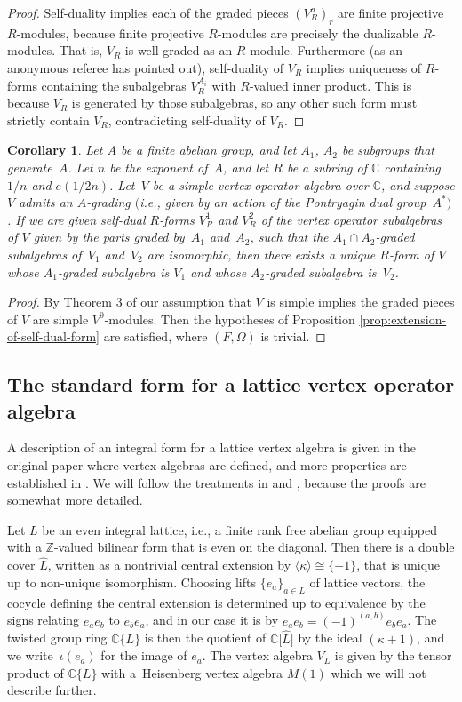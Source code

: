 \documentclass[pdftex]{sigma}
\newcommand{\bC}{\mathbb{C}}
\newcommand{\bZ}{\mathbb{Z}}
\newtheorem{cor}[thm]{Corollary}
\theoremstyle{definition}
\begin{document}
\begin{proof}
Self-duality implies each of the graded pieces $(V^a_R)_r$ are finite projective $R$-modules, because finite projective $R$-modules are precisely the dualizable $R$-modules. That is, $V_R$ is well-graded as an $R$-module. Furthermore (as an anonymous referee has pointed out), self-duality of $V_R$ implies uniqueness of $R$-forms containing the subalgebras $V^{A_i}_R$ with $R$-valued inner product. This is because $V_R$ is generated by those subalgebras, so any other such form must strictly contain $V_R$, contradicting self-duality of $V_R$.
\end{proof}

\begin{cor} \label{cor:voa-generated-by-subvoas}Let $A$ be a finite abelian group, and let $A_1$, $A_2$ be subgroups that generate~$A$. Let $n$ be the exponent of~$A$, and let $R$ be a subring of $\bC$ containing $1/n$ and $e(1/2n)$. Let~$V$ be a simple vertex operator algebra over $\bC$, and suppose $V$ admits an $A$-grading $($i.e., given by an action of the Pontryagin dual group~$A^*)$. If we are given self-dual $R$-forms $V_R^1$ and $V_R^2$ of the vertex operator subalgebras of $V$ given by the parts graded by~$A_1$ and~$A_2$, such that the $A_1 \cap A_2$-graded subalgebras of~$V_1$ and~$V_2$ are isomorphic, then there exists a unique $R$-form of $V$ whose $A_1$-graded subalgebra is $V_1$ and whose $A_2$-graded subalgebra is~$V_2$.
\end{cor}
\begin{proof}
By Theorem 3 of \cite{DM94a} our assumption that $V$ is simple implies the graded pieces of $V$ are simple $V^0$-modules. Then the hypotheses of Proposition \ref{prop:extension-of-self-dual-form} are satisfied, where $(F,\Omega)$ is trivial.
\end{proof}

\subsection{The standard form for a lattice vertex operator algebra}

A description of an integral form for a lattice vertex algebra is given in the original paper \cite{B86} where vertex algebras are defined, and more properties are established in \cite{B99}. We will follow the treatments in \cite{DG12} and \cite{M14}, because the proofs are somewhat more detailed.

Let $L$ be an even integral lattice, i.e., a finite rank free abelian group equipped with a $\bZ$-valued bilinear form that is even on the diagonal. Then there is a double cover $\hat{L}$, written as a nontrivial central extension by $ \langle \kappa \rangle \cong \{\pm 1\}$, that is unique up to non-unique isomorphism. Choosing lifts $\{ e_a \}_{a\in L}$ of lattice vectors, the cocycle defining the central extension is determined up to equivalence by the signs relating $e_a e_b$ to $e_b e_a$, and in our case it is by $e_a e_b = (-1)^{(a,b)} e_b e_a$. The twisted group ring $\bC\{L\}$ is then the quotient of $\bC\big[\hat{L}\big]$ by the ideal $(\kappa + 1)$, and we write~$\iota(e_a)$ for the image of $e_a$. The vertex algebra $V_L$ is given by the tensor product of $\bC\{L\}$ with a~Heisenberg vertex algebra $M(1)$ which we will not describe further.
\end{document}
